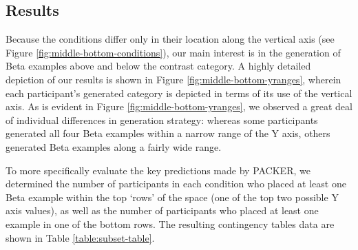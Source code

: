 \documentclass[10pt,letterpaper]{article}
\begin{document}


\subsection{Results}

Because the conditions differ only in their location along the vertical axis (see Figure \ref{fig:middle-bottom-conditions}), our main interest is in the generation of Beta examples above and below the contrast category. A highly detailed depiction of our results is shown in Figure \ref{fig:middle-bottom-yranges}, wherein each participant's generated category is depicted in terms of its use of the vertical axis. As is evident in Figure \ref{fig:middle-bottom-yranges}, we observed a great deal of individual differences in generation strategy: whereas some participants generated all four Beta examples within a narrow range of the Y axis, others generated Beta examples along a fairly wide range. 

\begin{figure*}
    \begin{center}
    
    \caption{Behavioral results. Each line shows the minimum and maximum value of a generated category along the Y (vertical) axis. Dots along each line represent the positions of individual exemplars in the category, and each participant's category is shown on a separate line. Participants are sorted by overall Y axis range, and then by condition.}
    \label{fig:middle-bottom-yranges}
    \end{center}
\end{figure*}

To more specifically evaluate the key predictions made by PACKER, we determined the number of participants in each condition who placed at least one Beta example within the top `rows' of the space (one of the top two possible Y axis values), as well as the number of participants who placed at least one example in one of the bottom rows. The resulting contingency tables data are shown in Table \ref{table:subset-table}.
\end{document}
